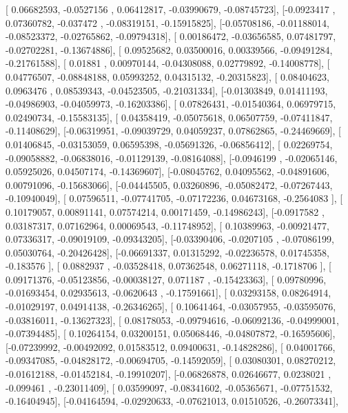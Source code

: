 \documentclass{article}
\begin{document}
       [ 0.06682593, -0.0527156 ,  0.06412817, -0.03990679, -0.08745723],
       [-0.0923417 ,  0.07360782, -0.037472  , -0.08319151, -0.15915825],
       [-0.05708186, -0.01188014, -0.08523372, -0.02765862, -0.09794318],
       [ 0.00186472, -0.03656585,  0.07481797, -0.02702281, -0.13674886],
       [ 0.09525682,  0.03500016,  0.00339566, -0.09491284, -0.21761588],
       [ 0.01881   ,  0.00970144, -0.04308088,  0.02779892, -0.14008778],
       [ 0.04776507, -0.08848188,  0.05993252,  0.04315132, -0.20315823],
       [ 0.08404623,  0.0963476 ,  0.08539343, -0.04523505, -0.21031334],
       [-0.01303849,  0.01411193, -0.04986903, -0.04059973, -0.16203386],
       [ 0.07826431, -0.01540364,  0.06979715,  0.02490734, -0.15583135],
       [ 0.04358419, -0.05075618,  0.06507759, -0.07411847, -0.11408629],
       [-0.06319951, -0.09039729,  0.04059237,  0.07862865, -0.24469669],
       [ 0.01406845, -0.03153059,  0.06595398, -0.05691326, -0.06856412],
       [ 0.02269754, -0.09058882, -0.06838016, -0.01129139, -0.08164088],
       [-0.0946199 , -0.02065146,  0.05925026,  0.04507174, -0.14369607],
       [-0.08045762,  0.04095562, -0.04891606,  0.00791096, -0.15683066],
       [-0.04445505,  0.03260896, -0.05082472, -0.07267443, -0.10940049],
       [ 0.07596511, -0.07741705, -0.07172236,  0.04673168, -0.2564083 ],
       [ 0.10179057,  0.00891141,  0.07574214,  0.00171459, -0.14986243],
       [-0.0917582 ,  0.03187317,  0.07162964,  0.00069543, -0.11748952],
       [ 0.10389963, -0.00921477,  0.07336317, -0.09019109, -0.09343205],
       [-0.03390406, -0.0207105 , -0.07086199,  0.05030764, -0.20426428],
       [-0.06691337,  0.01315292, -0.02236578,  0.01745358, -0.183576  ],
       [ 0.0882937 , -0.03528418,  0.07362548,  0.06271118, -0.1718706 ],
       [ 0.09171376, -0.05123856, -0.00038127,  0.071187  , -0.15423363],
       [ 0.09780996, -0.01693454,  0.02935613, -0.0620643 , -0.17591661],
       [ 0.03293158,  0.08264914, -0.01029197,  0.04914138, -0.26346265],
       [ 0.10641464, -0.03057955, -0.03595076, -0.03816011, -0.13627323],
       [ 0.08178053, -0.09794616, -0.06092136, -0.04999001, -0.07394485],
       [ 0.10264154,  0.03200151,  0.05068446, -0.04807872, -0.16595606],
       [-0.07239992, -0.00492092,  0.01583512,  0.09400631, -0.14828286],
       [ 0.04001766, -0.09347085, -0.04828172, -0.00694705, -0.14592059],
       [ 0.03080301,  0.08270212, -0.01612188, -0.01452184, -0.19910207],
       [-0.06826878,  0.02646677,  0.0238021 , -0.099461  , -0.23011409],
       [ 0.03599097, -0.08341602, -0.05365671, -0.07751532, -0.16404945],
       [-0.04164594, -0.02920633, -0.07621013,  0.01510526, -0.26073341],
\end{document}
